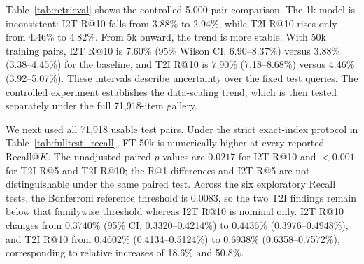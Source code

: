 \documentclass[runningheads]{llncs}
\begin{document}
\begin{table}[t]
\caption{Controlled retrieval performance on the fixed 5,000-pair test subset. Recall values are reported as percentages. The FT-50k row corresponds to the final epoch-3 training state; boldface highlights the strongest controlled result.}
\label{tab:retrieval}
\centering
\scriptsize
\setlength{\tabcolsep}{3.5pt}
\end{table}

Table~\ref{tab:retrieval} shows the controlled 5,000-pair comparison. The 1k model is inconsistent: I2T R@10 falls from 3.88\% to 2.94\%, while T2I R@10 rises only from 4.46\% to 4.82\%. From 5k onward, the trend is more stable. With 50k training pairs, I2T R@10 is 7.60\% (95\% Wilson CI, 6.90--8.37\%) versus 3.88\% (3.38--4.45\%) for the baseline, and T2I R@10 is 7.90\% (7.18--8.68\%) versus 4.46\% (3.92--5.07\%). These intervals describe uncertainty over the fixed test queries. The controlled experiment establishes the data-scaling trend, which is then tested separately under the full 71,918-item gallery.

We next used all 71,918 usable test pairs. Under the strict exact-index protocol in Table~\ref{tab:fulltest_recall}, FT-50k is numerically higher at every reported Recall@$K$. The unadjusted paired $p$-values are $0.0217$ for I2T R@10 and $<0.001$ for T2I R@5 and T2I R@10; the R@1 differences and I2T R@5 are not distinguishable under the same paired test. Across the six exploratory Recall tests, the Bonferroni reference threshold is $0.0083$, so the two T2I findings remain below that familywise threshold whereas I2T R@10 is nominal only. I2T R@10 changes from 0.3740\% (95\% CI, 0.3320--0.4214\%) to 0.4436\% (0.3976--0.4948\%), and T2I R@10 from 0.4602\% (0.4134--0.5124\%) to 0.6938\% (0.6358--0.7572\%), corresponding to relative increases of 18.6\% and 50.8\%.
\end{document}
